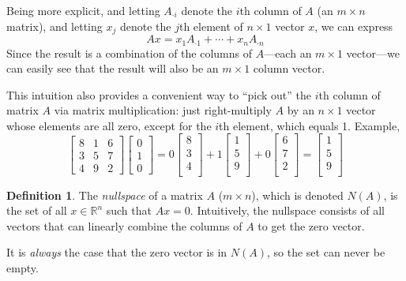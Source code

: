 \documentclass[12pt]{article}
\theoremstyle{plain}
\theoremstyle{definition}
\newtheorem{defn}[thm]{Definition}
\theoremstyle{remark}
\begin{document}
Being more explicit, and letting $A_{\cdot i}$ denote the $i$th column of $A$ (an $m\times n$ matrix), and letting $x_j$ denote the $j$th element of $n\times 1$ vector $x$, we can express
\[
  A x = x_1 A_{\cdot 1}  + \cdots + x_n A_{\cdot n}
\]
Since the result is a combination of the columns of $A$---each an $m\times 1$ vector---we can easily see that the result will also be an $m\times 1$ column vector.

This intuition also provides a convenient way to ``pick out'' the $i$th column of matrix $A$ via matrix multiplication: just right-multiply $A$ by an $n \times 1$ vector whose elements are all zero, except for the $i$th element, which equals 1. Example,
\[
  \begin{bmatrix}
  8 & 1 & 6 \\
  3 & 5 & 7 \\
  4 & 9 & 2
  \end{bmatrix}
  \begin{bmatrix}
  0 \\ 1 \\ 0
  \end{bmatrix}
  = 0
  \begin{bmatrix} 8 \\ 3 \\ 4 \\ \end{bmatrix}
  + 1  \begin{bmatrix} 1 \\ 5 \\ 9 \\ \end{bmatrix}
  + 0  \begin{bmatrix} 6 \\ 7 \\ 2 \\ \end{bmatrix}
  =
  \begin{bmatrix} 1 \\ 5 \\ 9 \\ \end{bmatrix}
\]


\begin{defn}
The \emph{nullspace} of a matrix $A$ ($m\times n$), which is denoted $N(A)$, is the set of all $x \in \mathbb{R}^n$ such that $Ax=0$. Intuitively, the nullspace consists of all vectors that can linearly combine the columns of $A$ to get the zero vector.

It is \emph{always} the case that the zero vector is in $N(A)$, so the set can never be empty.
\end{defn}
\end{document}

